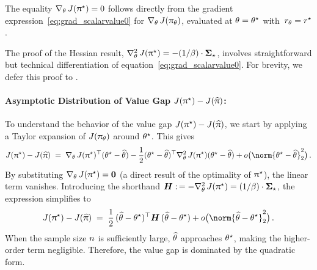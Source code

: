     The equality $ \nabla_{\theta} \,  J(\uppi^{\star}) = 0$ follows directly from the gradient expression~\eqref{eq:grad_scalarvalue0} for $ \nabla_{\theta} \,  J(\uppi_{\theta}) $, evaluated at $ \theta = \theta^{\star} $ with~\mbox{$ r_{\theta} = r^{\star} $}.
    
    The proof of the Hessian result, $ \nabla_{\theta}^2 \,  J(\uppi^{\star}) = - (1 / \beta) \cdot \boldsymbol{\Sigma}_{\star} $, involves straightforward but technical differentiation of equation~\eqref{eq:grad_scalarvalue0}. For brevity, we defer this proof to .
  
  	\paragraph{Asymptotic Distribution of Value Gap $ J(\uppi^{\star}) - J(\widehat{\uppi}) $:}
    To understand the behavior of the value gap $ J(\uppi^{\star}) - J(\widehat{\uppi}) $, we start by applying a Taylor expansion of $ J(\uppi_{\theta}) $ around $ \theta^{\star} $. This gives
	\begin{align*}
		\scalarvalue(\policystar) - \scalarvalue(\policyhat)
		\; = \; \gradtheta \scalarvalue(\policystar)^{\top} (\parathetastar - \parathetahat) - \frac{1}{2} (\parathetastar - \parathetahat)^{\top} \hesstheta \scalarvalue(\policystar) (\parathetastar - \parathetahat) + \smallo\big( \norm{\parathetastar - \parathetahat}_2^2 \big) \, .
	\end{align*}
	By substituting $ \nabla_{\theta} \,  J(\uppi^{\star}) = \boldsymbol{0} $ (a direct result of the optimality of $ \uppi^{\star} $), the linear term vanishes. Introducing the shorthand $ \boldsymbol{H} :\,= -\nabla_{\theta}^2 \,  J(\uppi^{\star}) = (1 / \beta) \cdot \boldsymbol{\Sigma}_{\star} $, the expression simplifies to
	\begin{align}
		\label{eq:Taylor_scalarvalue}
		\scalarvalue(\policystar) - \scalarvalue(\policyhat)
		\; = \; \frac{1}{2} \, (\parathetahat - \parathetastar)^{\top} \HessMt \, (\parathetahat - \parathetastar) + \smallo\big( \norm{\parathetahat - \parathetastar}_2^2 \big) \, .
	\end{align}
	When the sample size $ n $ is sufficiently large, $ \widehat{\theta} $ approaches $ \theta^{\star} $, making the higher-order term negligible. Therefore, the value gap is dominated by the quadratic form.
	
